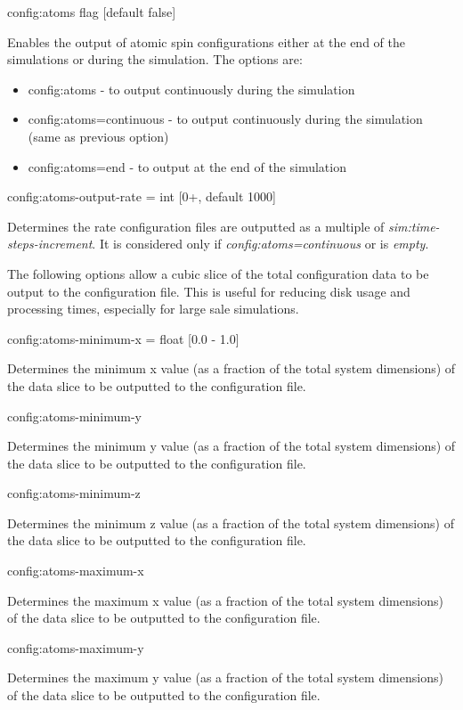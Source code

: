 {\zicf config:atoms flag [default false]} Enables the output of atomic spin configurations either at the end of the simulations or during the simulation. The options are:

\begin{itemize}
  \item[] config:atoms - to output continuously during the simulation
  \item[] config:atoms=continuous - to output continuously during the simulation (same as previous option)
  \item[] config:atoms=end - to output at the end of the simulation
\end{itemize}

{\zicf config:atoms-output-rate = int [0+, default 1000]} Determines the rate configuration files are outputted as a multiple of \textit{sim:time-steps-increment}. It is considered only if \textit{config:atoms=continuous} or is \textit{empty}.

The following options allow a cubic slice of the total configuration data to be output to the configuration file. This is useful for reducing disk usage and processing times, especially for large sale simulations.

{\zicf config:atoms-minimum-x = float [0.0 - 1.0]} Determines the minimum x value (as a fraction of the total system dimensions) of the data slice to be outputted to the configuration file.

{\zicf config:atoms-minimum-y} Determines the minimum y value (as a fraction of the total system dimensions) of the data slice to be outputted to the configuration file.

{\zicf config:atoms-minimum-z} Determines the minimum z value (as a fraction of the total system dimensions) of the data slice to be outputted to the configuration file.

{\zicf config:atoms-maximum-x} Determines the maximum x value (as a fraction of the total system dimensions) of the data slice to be outputted to the configuration file.

{\zicf config:atoms-maximum-y} Determines the maximum y value (as a fraction of the total system dimensions) of the data slice to be outputted to the configuration file.

